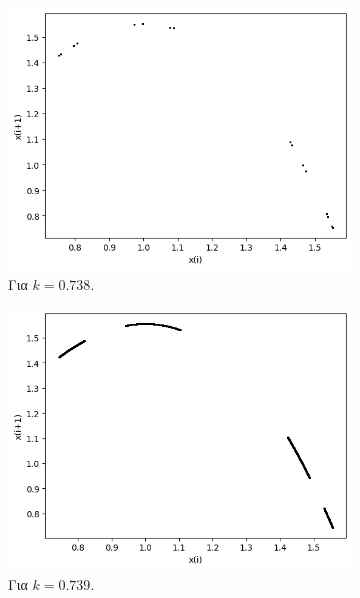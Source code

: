 \begin{figure}[h!]
	\centering
	\begin{subfigure}[b]{0.4\textwidth}
		\centering
		\includegraphics[width=\textwidth]{LateX images/graphs q14/g17}
		\caption{Για $k=0.738$.}
		\label{f:k74}
	\end{subfigure}
	\hfill
	\begin{subfigure}[b]{0.4\textwidth}
		\centering
		\includegraphics[width=\textwidth]{LateX images/graphs q14/g18}
		\caption{Για $k=0.739$.}
		\label{f:k75}
	\end{subfigure}
	\hfill
	\begin{subfigure}[b]{0.4\textwidth}
		\centering

\end{subfigure}
\end{figure}
